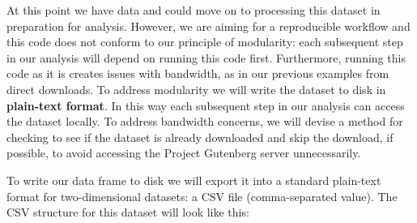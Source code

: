\documentclass[
]{article}
\newenvironment{Shaded}{\begin{snugshade}}{\end{snugshade}}
\newcommand{\AttributeTok}[1]{\textcolor[rgb]{0.77,0.63,0.00}{#1}}
\newcommand{\CommentTok}[1]{\textcolor[rgb]{0.56,0.35,0.01}{\textit{#1}}}
\newcommand{\FunctionTok}[1]{\textcolor[rgb]{0.00,0.00,0.00}{#1}}
\newcommand{\NormalTok}[1]{#1}
\newcommand{\OtherTok}[1]{\textcolor[rgb]{0.56,0.35,0.01}{#1}}
\newcommand{\SpecialCharTok}[1]{\textcolor[rgb]{0.00,0.00,0.00}{#1}}
\newcommand{\StringTok}[1]{\textcolor[rgb]{0.31,0.60,0.02}{#1}}
\begin{document}
\begin{Shaded}
\end{Shaded}

At this point we have data and could move on to processing this dataset in preparation for analysis. However, we are aiming for a reproducible workflow and this code does not conform to our principle of modularity: each subsequent step in our analysis will depend on running this code first. Furthermore, running this code as it is creates issues with bandwidth, as in our previous examples from direct downloads. To address modularity we will write the dataset to disk in \textbf{plain-text format}. In this way each subsequent step in our analysis can access the dataset locally. To address bandwidth concerns, we will devise a method for checking to see if the dataset is already downloaded and skip the download, if possible, to avoid accessing the Project Gutenberg server unnecessarily.

To write our data frame to disk we will export it into a standard plain-text format for two-dimensional datasets: a CSV file (comma-separated value). The CSV structure for this dataset will look like this:
\end{document}
